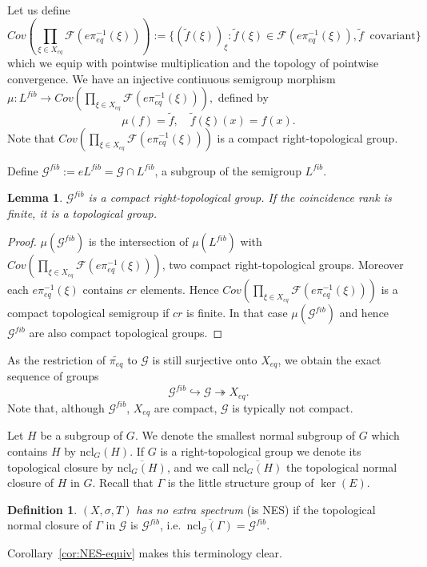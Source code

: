 \documentclass[12pt]{amsart}
\newtheorem{lemma}[theorem]{Lemma}
\theoremstyle{definition}
\newtheorem{definition}[theorem]{Definition}
\numberwithin{equation}{section}
\newcommand{\Ff}{{\mathcal F}}
\newcommand{\Gg}{{\mathcal G}}
\newcommand{\Xe}{X_{eq}}
\newcommand{\pe}{\pi_{eq}}
\newcommand{\tpe}{\widetilde{\pe}}
\begin{document}
Let us define
\begin{equation}\label{eq-cov} 
Cov(\prod_{\xi\in \Xe} \Ff(e\pe^{-1}(\xi))):=\{(\tilde f(\xi))_\xi :\tilde f(\xi)\in \Ff(e\pe^{-1}(\xi)), \tilde f\: \mbox{ covariant}\}
\end{equation} 
which we equip with pointwise multiplication and the topology of pointwise convergence. We have an injective continuous semigroup morphism
$\mu:L^{fib}\to Cov(\prod_{\xi\in \Xe} \Ff(e\pe^{-1}(\xi))),$ defined by
\begin{equation}\label{def:mu}
\mu(f) = \tilde f,\quad \tilde f(\xi)(x) = f(x).\end{equation}Note that  $Cov(\prod_{\xi\in \Xe} \Ff(e\pe^{-1}(\xi)))$ is a  compact right-topological group.
 
Define $\Gg^{fib}:=e L^{fib}=\Gg\cap L^{fib}$, a subgroup of the semigroup $L^{fib}$. 
\begin{lemma} 
$\Gg^{fib}$ is a compact right-topological group. If the coincidence rank is finite, it is a topological group. 
\end{lemma}
\begin{proof} $\mu(\Gg^{fib})$ is the intersection of $\mu(L^{fib})$ with $Cov(\prod_{\xi\in \Xe} \Ff(e\pe^{-1}(\xi)))$, 
two compact right-topological groups. 
Moreover each $e\pe^{-1}(\xi)$ contains $cr$ elements. Hence $Cov(\prod_{\xi\in \Xe} \Ff(e\pe^{-1}(\xi)))$ is a compact topological semigroup if $cr$ is finite.
In that case $\mu(\Gg^{fib})$ and hence $\Gg^{fib}$ are also compact topological groups.
\end{proof}
As the restriction of $\tpe$ to $\Gg$ is still surjective onto $\Xe$, we obtain the exact sequence of groups
\begin{equation}\label{eq-SES}
\Gg^{fib} \hookrightarrow \Gg \twoheadrightarrow \Xe.
\end{equation} 
Note that, although  $\Gg^{fib}$, $\Xe$ are compact, $\Gg$ is typically not compact. %

Let $H$ be a subgroup of $G$. 
We denote the smallest normal subgroup of $G$ which contains $H$ by $\text{ncl}_G(H)$. If $G$ is a right-topological group we denote  its topological closure by 
$\overline{\text{ncl}_G(H)}$, and
we call $\overline{\text{ncl}_G(H)}$ the topological  normal closure of $H$ in $G$. Recall that $\Gamma$ is the little structure group of $\ker(E)$.

\begin{definition}\label{def:NES}
$(X,\sigma,T)$ {\em has no extra spectrum} (is NES) if the topological normal closure of $\Gamma$ in $\Gg$ is $\Gg^{fib}$, i.e.\ $\overline{\text{ncl}_{\Gg}(\Gamma)} = \Gg^{fib}$.
\end{definition}
 Corollary~\ref{cor:NES-equiv} makes this terminology clear.
\end{document}
